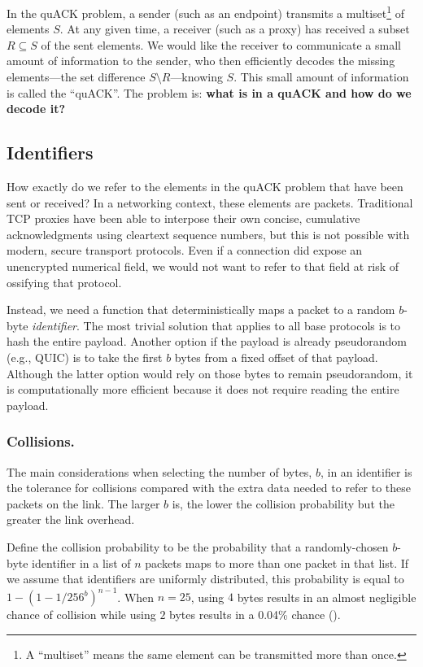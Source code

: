 In the quACK problem, a sender (such as an endpoint) transmits a
multiset\footnote{A ``multiset'' means the same element can be transmitted more
than once.} of elements $S$. At any given time, a receiver (such as a proxy)
has received a subset $R \subseteq S$ of the sent elements. We would like the
receiver to communicate a small amount of information to the sender, who then
efficiently decodes the missing elements---the set difference $S \setminus
R$---knowing $S$. This small amount of information is called the ``quACK''. The
problem is: \textbf{what is in a quACK and how do we decode it?}

\subsection{Identifiers}
\label{sec:quack:problem:identifiers}

How exactly do we refer to the elements in the quACK problem that have been sent
or received? In a networking context, these elements are packets. Traditional
TCP proxies have been able to interpose their own concise, cumulative
acknowledgments using cleartext sequence numbers, but this is not possible with
modern, secure transport protocols. Even if a connection did expose an
unencrypted numerical field, we would not want to refer to that field at risk
of ossifying that protocol.

Instead, we need a function that deterministically maps
a packet to a random $b$-byte \emph{identifier}. The most trivial solution
that applies to all base protocols is
to hash the entire payload. Another option if the payload is already
pseudorandom (e.g., QUIC) is to take the first $b$ bytes from a fixed
offset of that payload. Although the latter option would rely on those bytes
to remain pseudorandom, it is computationally more efficient because it
does not require reading the entire payload.

\subsubsection{Collisions.}
The main considerations when selecting the number of bytes, $b$, in an
identifier is the tolerance for collisions compared with the extra data
needed to refer to these packets on the link. The larger $b$ is, the lower
the collision probability but the greater the link overhead.

Define the collision probability to be the probability that a randomly-chosen
$b$-byte identifier in a list of $n$ packets maps to more than one packet in
that list.
If we assume that identifiers are uniformly distributed,
this probability is equal to $1-(1 - 1/256^{b})^{n-1}$.
When $n=25$,  using $4$ bytes results in an almost negligible chance of
collision while using $2$ bytes results in a 0.04\% chance
().

